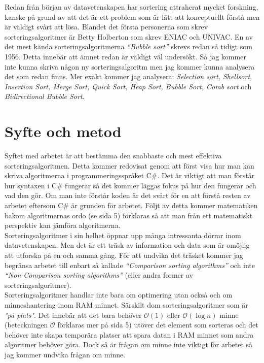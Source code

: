 \documentclass[a4, oneside]{report}
\begin{document}
Redan från början av datavetenskapen har sortering attraherat mycket forskning, kanske på grund av att det är ett problem som är lätt att konceptuellt förstå men är väldigt svårt att lösa. Blandet det första personerna som skrev sorteringsalgoritmer är Betty Holberton som skrev ENIAC och UNIVAC. En av det mest kända sorteringsalgoritmerna \textit{“Bubble sort”} skrevs redan så tidigt som 1956. Detta innebär att ämnet redan är väldigt väl undersökt. Så jag kommer inte kunna skriva någon ny sorteringsalgoritm men jag kommer kunna analysera det som redan finns. \cite{1} Mer exakt kommer jag analysera: \textit{Selection sort, Shellsort, Insertion Sort, Merge Sort, Quick Sort, Heap Sort, Bubble Sort, Comb sort} och \textit{Bidirectional Bubble Sort}.

\section{Syfte och metod}
Syftet med arbetet är att bestämma den snabbaste och mest effektiva sorteringsalgoritmen. Detta kommer redovisat genom att först visa hur man kan skriva algoritmerna i programmeringsspråket C\#. Det är viktigt att man förstår hur syntaxen i C\# fungerar så det kommer läggas fokus på hur den fungerar och vad den gör. Om man inte förstår koden är det svårt för en att förstå resten av arbetet eftersom C\# är grunden för arbetet. Följt av detta kommer matematiken bakom algoritmernas ordo (se sida 5) förklaras så att man från ett matematiskt perspektiv kan jämföra algoritmerna.\\
Sorteringsalgoritmer i sin helhet öppnar upp många intressanta dörrar inom datavetenskapen. Men det är ett träsk av information och data som är omöjlig att utforska på en och samma gång. För att undvika det träsket kommer jag begränsa arbetet till enbart så kallade \textit{“Comparison sorting algorithms”} och inte \textit{“Non-Comparison sorting algorithms”} (eller andra former av sorteringsalgoritmer).\\
Sorteringsalgoritmer handlar inte bara om optimering utan också och om minneshantering inom RAM minnet. Särskilt dom sorteringsalgoritmer som är \textit{"på plats"}. Det innebär att det bara behöver $\mathcal{O}(1)$ eller $\mathcal{O}(\log{n})$ minne (beteckningen $\mathcal{O}$ förklaras mer på sida 5) utöver det element som sorteras och det behöver inte skapa temporära platser att spara datan i RAM minnet som andra algoritmer behöver göra. \cite{3} Dock så är frågan om minne inte viktigt för arbetet så jag kommer undvika frågan om minne.
\end{document}
